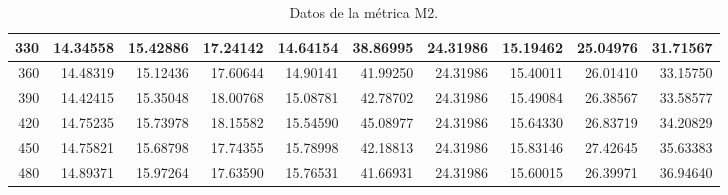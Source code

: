 \begin{table}[h]
\begin{tabular}{|r|r|r|r|r|r|r|r|r|r|}
        \hline \tiny 330 &{\tiny 14.34558}&{\tiny 15.42886}&{\tiny 17.24142}&{\tiny
        14.64154}&{\tiny 38.86995}&{\tiny 24.31986}&{\tiny 15.19462}&{\tiny 25.04976} &{\tiny 31.71567} \\
        \hline \tiny 360 &{\tiny 14.48319}&{\tiny 15.12436}&{\tiny 17.60644}&{\tiny
        14.90141}&{\tiny 41.99250}&{\tiny 24.31986}&{\tiny 15.40011}&{\tiny 26.01410} &{\tiny 33.15750} \\
        \hline \tiny 390 &{\tiny 14.42415}&{\tiny 15.35048}&{\tiny 18.00768}&{\tiny
        15.08781}&{\tiny 42.78702}&{\tiny 24.31986}&{\tiny 15.49084}&{\tiny 26.38567} &{\tiny 33.58577} \\
        \hline \tiny 420 &{\tiny 14.75235}&{\tiny 15.73978}&{\tiny 18.15582}&{\tiny
        15.54590}&{\tiny 45.08977}&{\tiny 24.31986}&{\tiny 15.64330}&{\tiny 26.83719} &{\tiny 34.20829} \\
        \hline \tiny 450 &{\tiny 14.75821}&{\tiny 15.68798}&{\tiny 17.74355}&{\tiny
        15.78998}&{\tiny 42.18813}&{\tiny 24.31986}&{\tiny 15.83146}&{\tiny 27.42645} &{\tiny 35.63383} \\
        \hline \tiny 480 &{\tiny 14.89371}&{\tiny 15.97264}&{\tiny 17.63590}&{\tiny
        15.76531}&{\tiny 41.66931}&{\tiny 24.31986}&{\tiny 15.60015}&{\tiny 26.39971} &{\tiny 36.94640} \\
        \hline
    \end{tabular}
    \caption{Datos de la m\'etrica M2.}
    \label{tabA2}
\end{table}

